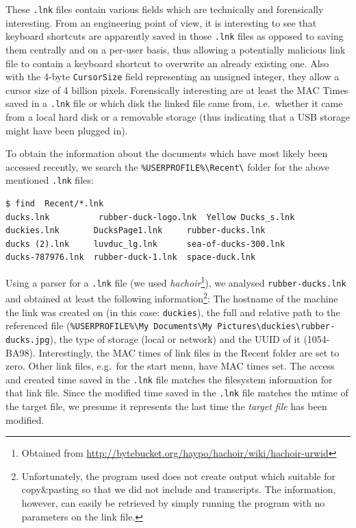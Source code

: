 \documentclass[a4paper,
    11pt,
    normalheadings,
    parindent,
    UKenglish,
    abstracton,
    ]{scrartcl}
\begin{document}
These \texttt{.lnk} files contain various fields which are technically and forensically interesting.
From an engineering point of view, it is interesting to see that keyboard shortcuts  are apparently saved in those \texttt{.lnk} files as opposed to saving them centrally and on a per-user basis, thus allowing a potentially malicious link file to contain a keyboard shortcut to overwrite an already existing one.
Also with the 4-byte \texttt{CursorSize} field representing an unsigned integer, they allow a cursor size of 4 billion pixels.
Forensically interesting are at least the MAC Times saved in a \texttt{.lnk} file or which disk the linked file came from, i.e.\, whether it came from a local hard disk or a removable storage (thus indicating that a USB storage might have been plugged in).

To obtain the information about the documents which have most likely been accessed recently, we search the \texttt{\%USERPROFILE\%\textbackslash{}Recent\textbackslash{}} folder for the above mentioned \texttt{.lnk} files:

\begin{verbatim}
$ find  Recent/*.lnk
ducks.lnk          rubber-duck-logo.lnk  Yellow Ducks_s.lnk
duckies.lnk       DucksPage1.lnk     rubber-ducks.lnk
ducks (2).lnk     luvduc_lg.lnk      sea-of-ducks-300.lnk
ducks-787976.lnk  rubber-duck-1.lnk  space-duck.lnk
\end{verbatim}

Using a parser for a \texttt{.lnk} file (we used \emph{hachoir}\footnote{Obtained from \url{http://bytebucket.org/haypo/hachoir/wiki/hachoir-urwid}}), we analysed \texttt{rubber-ducks.lnk} and obtained at least the following information\footnote{Unfortunately, the program used does not create output which suitable for copy\&pasting so that we did not include and transcripts. The information, however, can easily be retrieved by simply running the program with no parameters on the link file.}:
The hostname of the machine the link was created on (in this case: \texttt{duckies}), the full and relative path to the referenced file (\texttt{\%USERPROFILE\%\textbackslash{}My Documents\textbackslash{}My Pictures\textbackslash{}duckies\textbackslash{}rubber-ducks.jpg}), the type of storage (local or network) and the UUID of it (1054-BA98).
Interestingly, the MAC times of link files in the Recent folder are set to zero.
Other link files, e.g.\, for the start menu, have MAC times set.
The access and created time saved in the \texttt{.lnk} file matches the filesystem information for that link file.
Since the modified time saved in the \texttt{.lnk} file matches the mtime of the target file, we presume it represents the last time the \emph{target file} has been modified.
\end{document}
